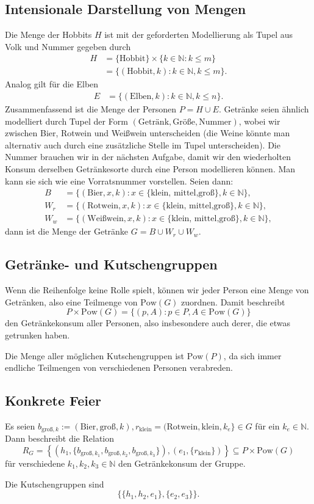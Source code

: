 \documentclass[a4paper]{article}
\newcommand{\pot}{\mathrm {Pow}}
\begin{document}
\subsection{Intensionale Darstellung von Mengen}
Die Menge der Hobbits $H$ ist mit der geforderten Modellierung als Tupel aus Volk und Nummer gegeben durch
\begin{align*}
    H &= \{ \text{Hobbit} \} \times \{ k \in ℕ: k \le m \} \\
    &= \{ (\text{Hobbit}, k) : k\in ℕ, k\le m \} .
\end{align*}
Analog gilt für die Elben
\begin{align*}
    E &= \{ ( \text{Elben}, k) : k\in ℕ, k\le n\}.
\end{align*}
Zusammenfassend ist die Menge der Personen $P = H\cup E$. 
Getränke seien ähnlich modelliert durch Tupel der Form $(\text{Getränk}, \text{Größe}, \text{Nummer})$, wobei wir zwischen Bier, Rotwein und Weißwein unterscheiden (die Weine könnte man alternativ auch durch eine zusätzliche Stelle im Tupel unterscheiden). Die Nummer brauchen wir in der nächsten Aufgabe, damit wir den wiederholten Konsum derselben Getränkesorte durch eine Person modellieren können. Man kann sie sich wie eine Vorratsnummer vorstellen. Seien dann:
\begin{align*}
    B &= \{ (\text{Bier}, x,k): x \in \{\text{klein, mittel,groß}\}, k\in ℕ \},\\
    W_r &=  \{ (\text{Rotwein}, x,k): x \in \{\text{klein, mittel,groß}\} , k\in ℕ\}, \\
    W_w &=  \{ (\text{Weißwein}, x,k): x \in \{\text{klein, mittel,groß}\} , k\in ℕ\},
\end{align*}
dann ist die Menge der Getränke $G = B\cup W_r \cup W_w$.

\subsection{Getränke- und Kutschengruppen}
Wenn die Reihenfolge keine Rolle spielt, können wir jeder Person eine Menge von Getränken, also eine Teilmenge von $\pot(G)$ zuordnen. Damit beschreibt
$$P \times \pot (G) = \{ (p, A): p\in P, A \in \pot(G) \}$$
den Getränkekonsum aller Personen, also insbesondere auch derer, die etwas getrunken haben.

Die Menge aller möglichen Kutschengruppen ist $\pot(P)$, da sich immer endliche Teilmengen von verschiedenen Personen verabreden.

\subsection{Konkrete Feier}
Es seien $b_{\text{groß},k} := (\text{Bier}, \text{groß},k), r_{\text{klein}} = (\text{Rotwein},\text{klein},k_e \} \in G$ für ein $k_e \in ℕ$. Dann beschreibt die Relation 
$$R_G = \left\{ \left(h_1, \{ b_{\text{groß},k_1}, b_{\text{groß},k_2}, b_{\text{groß},k_3} \} \right) , (e_1 , \{ r_{\text{klein}} \} )\right\}  \subseteq P\times \pot(G)$$
für verschiedene $k_1,k_2,k_3\in ℕ$ den Getränkekonsum der Gruppe.

Die Kutschengruppen sind
$$\{ \{h_1,h_2, e_1\}, \{e_2,e_3\} \}.$$
\end{document}
